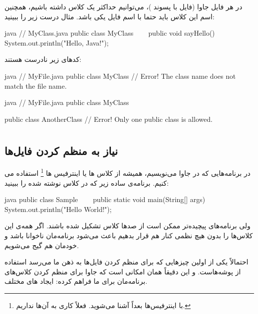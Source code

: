 در هر فایل جاوا (فایل با پسوند )، می‌توانیم حداکثر یک
کلاس  داشته باشیم، همچنین اسم این کلاس
 باید حتما با اسم فایل یکی باشد. مثال درست زیر را
ببینید:

\begin{codebox}{java}
// MyClass.java
public class MyClass {
    public void sayHello() {  
        System.out.println("Hello, Java!");  
    }  
}
\end{codebox}

کد‌های زیر نادرست هستند:

\begin{codebox}{java}
// MyFile.java
public class MyClass { } // Error! The class name does not match the file name.
\end{codebox}

\begin{codebox}{java}
// MyFile.java
public class MyClass { }

public class AnotherClass { } // Error! Only one public class is allowed.
\end{codebox}

\section{}

\subsection{نیاز به منظم کردن فایل‌ها}

در برنامه‌هایی که در جاوا می‌نویسیم، همیشه از کلاس ها یا اینترفیس ها
\footnote{با اینترفیس‌ها بعداً آشنا می‌شوید. فعلاً کاری به آن‌ها نداریم.}
استفاده می کنیم. برنامه‌ی ساده زیر که در کلاس  نوشته شده را
ببینید:

\begin{codebox}{java}
public class Sample {
    public static void main(String[] args) {  
        System.out.println("Hello World!");  
    }  
}
\end{codebox}

ولی برنامه‌های پیچیده‌تر ممکن است از صد‌ها کلاس تشکیل شده باشند. اگر همه‌ی
این کلاس‌ها را بدون هیچ نظمی کنار هم قرار بدهیم باعث می‌شود برنامه‌مان
ناخوانا باشد و خودمان هم گیج می‌شویم.

احتمالاً یکی از اولین چیز‌هایی که برای منظم کردن فایل‌ها به ذهن ما می‌رسد
استفاده از پوشه‌هاست. و این دقیقاً همان امکانی است که جاوا برای منظم کردن
کلاس‌های برنامه‌مان برای ما فراهم کرده: ایجاد ‌های
مختلف.

